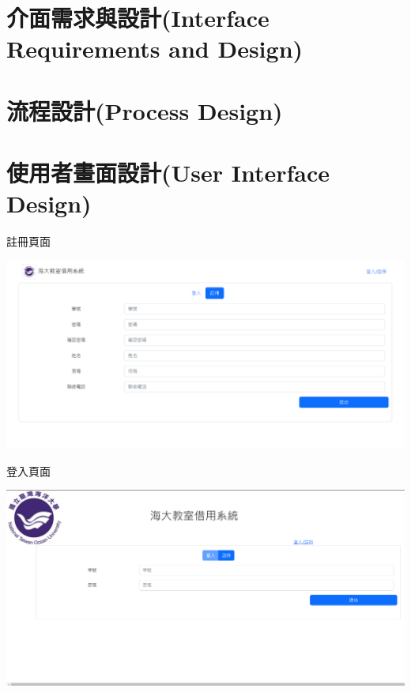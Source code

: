 \documentclass{article}
\begin{document}
\newpage

\section[介面需求與設計(INTERFACE REQUIREMENTS AND DESIGN)]{介面需求與設計(Interface Requirements and Design)}

\newpage

\section[流程設計(PROCESS DESIGN)]{流程設計(Process Design)}

\newpage

\section[使用者畫面設計(USER INTERFACE DESIGN)]{使用者畫面設計(User Interface Design)}

	\bigskip
	\begin{Large}
		註冊頁面
	\end{Large}

	\begin{center}
		\includegraphics[height=0.35\textheight]{SDDRegister.png}
	\end{center}

	\bigskip
	\bigskip
	\begin{Large}
		登入頁面
	\end{Large}

	\begin{center}
		\includegraphics[height=0.35\textheight]{SDDLogin.png}
	\end{center}
\end{document}

